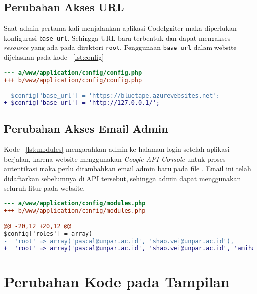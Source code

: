 \subsection{Perubahan Akses URL}
Saat admin pertama kali menjalankan aplikasi CodeIgniter maka diperlukan konfigurasi \texttt{base\_url}. Sehingga URL baru terbentuk dan dapat mengakses \textit{resource} yang ada pada direktori \texttt{root}. Penggunaan \texttt{base\_url} dalam website dijelaskan pada kode ~\ref{lst:config}\\

\begin{lstlisting}[language=diff, caption=Perubahan file /config/config.php,  basicstyle=\ttfamily, frame=single,
columns=fullflexible, keepspaces=true, breaklines=true, label={lst:config}]
--- a/www/application/config/config.php
+++ b/www/application/config/config.php

- $config['base_url'] = 'https://bluetape.azurewebsites.net';
+ $config['base_url'] = 'http://127.0.0.1/';
\end{lstlisting}

\subsection{Perubahan Akses Email Admin}

Kode ~\ref{lst:modules} mengarahkan admin ke halaman login setelah aplikasi berjalan, karena website menggunakan \textit{Google API Console} untuk proses autentikasi maka perlu ditambahkan email admin baru pada file . Email ini telah didaftarkan sebelumnya di API tersebut, sehingga admin dapat menggunakan seluruh fitur pada website. \\

\begin{lstlisting}[language=diff, caption=Perubahan file /config/modules.php,  basicstyle=\ttfamily, frame=single,
columns=fullflexible, keepspaces=true, breaklines=true, label={lst:modules}]
--- a/www/application/config/modules.php
+++ b/www/application/config/modules.php

@@ -20,12 +20,12 @@
$config['roles'] = array(
-  'root' => array('pascal@unpar.ac.id', 'shao.wei@unpar.ac.id'),
+  'root' => array('pascal@unpar.ac.id', 'shao.wei@unpar.ac.id', 'amihapsahapsa@gmail.com'),

\end{lstlisting}

\section{Perubahan Kode pada Tampilan}

